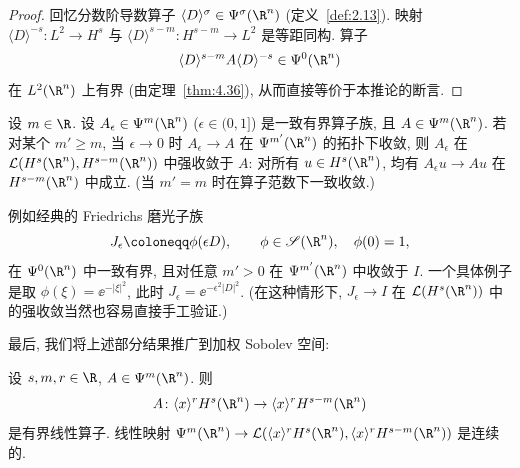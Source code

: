 \begin{proof}
回忆分数阶导数算子 $\langle D \rangle^\sigma \in \Psi^\sigma(\R^n)$ (定义~\ref{def:2.13}). 映射 $\langle D \rangle^{-s} \colon L^2 \to H^s$ 与 $\langle D \rangle^{s-m} \colon H^{s-m} \to L^2$ 是等距同构. 算子
\begin{equation}\label{eq:4.123}
    \langle D \rangle^{s-m} A \langle D \rangle^{-s} \in \Psi^0(\R^n)
\end{equation}
在 $L^2(\R^n)$ 上有界 (由定理~\ref{thm:4.36}), 从而直接等价于本推论的断言.
\end{proof}

\begin{lemma}[伪微分算子的强收敛性]\label{lem:4.39}
设 $m \in \R$. 设 $A_\epsilon \in \Psi^m(\R^n)$ ($\epsilon \in (0, 1]$) 是一致有界算子族, 且 $A \in \Psi^m(\R^n)$. 若对某个 $m' \ge m$, 当 $\epsilon \to 0$ 时 $A_\epsilon \to A$ 在 $\Psi^{m'}(\R^n)$ 的拓扑下收敛, 则 $A_\epsilon$ 在 $\mathcal{L}(H^s(\R^n), H^{s-m}(\R^n))$ 中强收敛于 $A$: 对所有 $u \in H^s(\R^n)$, 均有 $A_\epsilon u \to A u$ 在 $H^{s-m}(\R^n)$ 中成立. (当 $m' = m$ 时在算子范数下一致收敛.)
\end{lemma}

例如经典的 Friedrichs 磨光子族
\begin{equation}\label{eq:4.124}
    J_\epsilon \defeq \phi(\epsilon D), \qquad \phi \in \Schwartz(\R^n), \quad \phi(0) = 1,
\end{equation}
在 $\Psi^0(\R^n)$ 中一致有界, 且对任意 $m' > 0$ 在 $\Psi^{m'}(\R^n)$ 中收敛于 $I$. 一个具体例子是取 $\phi(\xi) = \ee^{-|\xi|^2}$, 此时 $J_\epsilon = \ee^{-\epsilon^2 |D|^2}$. (在这种情形下, $J_\epsilon \to I$ 在 $\mathcal{L}(H^s(\R^n))$ 中的强收敛当然也容易直接手工验证.)

最后, 我们将上述部分结果推广到加权 Sobolev 空间:

\begin{theorem}\label{thm:4.40}
设 $s, m, r \in \R$, $A \in \Psi^m(\R^n)$. 则
\[
    A \colon \langle x \rangle^r H^s(\R^n) \to \langle x \rangle^r H^{s-m}(\R^n)
\]
是有界线性算子. 线性映射 $\Psi^m(\R^n) \to \mathcal{L}(\langle x \rangle^r H^s(\R^n), \langle x \rangle^r H^{s-m}(\R^n))$ 是连续的.
\end{theorem}

